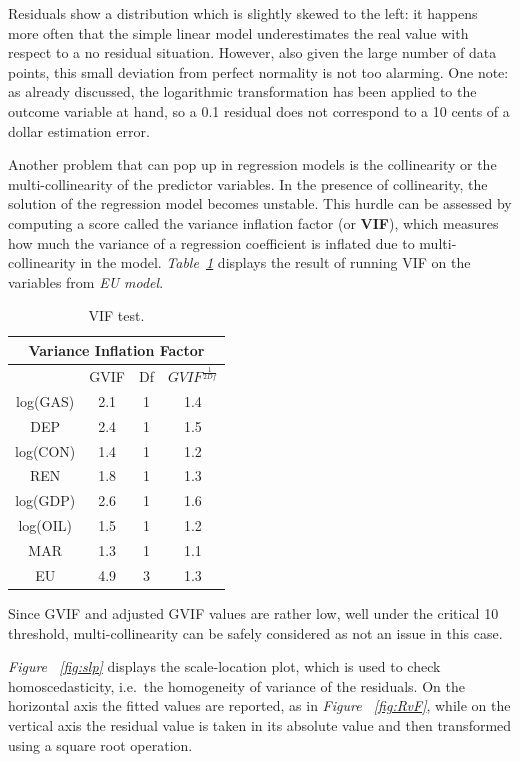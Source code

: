 \documentclass[a4paper,12pt]{book}
\begin{document}
Residuals show a distribution which is slightly skewed to the left: it happens more often that the simple linear model underestimates the real value with respect to a no residual situation. However, also given the large number of data points, this small deviation from perfect normality is not too alarming. One note: as already discussed, the logarithmic transformation has been applied to the outcome variable at hand, so a 0.1 residual does not correspond to a 10 cents of a dollar estimation error.

Another problem that can pop up in regression models is the collinearity or the multi-collinearity of the predictor variables. In the presence of collinearity, the solution of the regression model becomes unstable. This hurdle can be assessed by computing a score called the variance inflation factor (or \textbf{VIF}), which measures how much the variance of a regression coefficient is inflated due to multi-collinearity in the model. \textit{Table~\ref{Tab:vif}} displays the result of running VIF on the variables from \textit{EU model}.

\begin{table}[tb]
\begin{center}
\begin{tabular}{|c|c|c|c|}
\hline
\multicolumn{4}{|c|}{Variance Inflation Factor}\\
\hline
&GVIF&Df&$GVIF^{\frac{1}{2Df}}$\\
\hline
log(GAS)&2.1&1&1.4\\
DEP&2.4&1&1.5\\
log(CON)&1.4&1&1.2\\
REN&1.8&1&1.3\\
log(GDP)&2.6&1&1.6\\
log(OIL)&1.5&1&1.2\\
MAR&1.3&1&1.1\\
EU&4.9&3&1.3\\
\hline
\end{tabular}
\caption{VIF test.}
\label{Tab:vif}
\end{center}
\end{table}

Since GVIF and adjusted GVIF values are rather low, well under the critical 10 threshold, multi-collinearity can be safely considered as not an issue in this case.

\textit{Figure ~\ref{fig:slp}} displays the scale-location plot, which is used to check homoscedasticity, i.e.\ the homogeneity of variance of the residuals. On the horizontal axis the fitted values are reported, as in \textit{Figure ~\ref{fig:RvF}}, while on the vertical axis the residual value is taken in its absolute value and then transformed using a square root operation.
\end{document}
